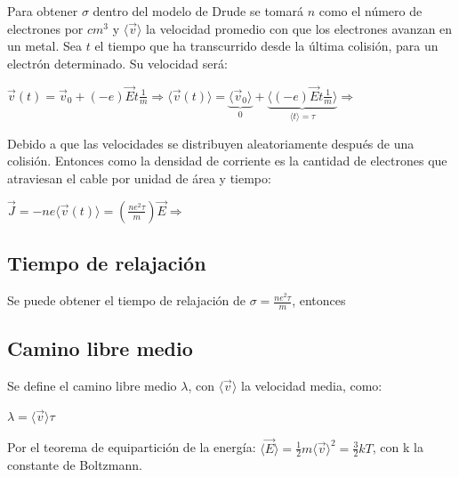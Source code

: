 \documentclass[oneside]{book}
\numberwithin{equation}{section}
\numberwithin{figure}{section}
\numberwithin{table}{section}
\begin{document}
				Para obtener $\sigma$ dentro del modelo de Drude se tomará $n$ como el número de electrones por $cm^3$ y $\langle \vec{v} \rangle$ la velocidad promedio con que los electrones avanzan en un metal. Sea $t$ el tiempo que ha transcurrido desde la última colisión, para un electrón
determinado. Su velocidad será:

				\begin{center}
					$\displaystyle \vec{v}(t)=\vec{v}_0+(-e)\vec{E}t\frac{1}{m} \Rightarrow \langle \vec{v}(t) \rangle=\underbrace{\langle \vec{v}_0 \rangle}_{0}+\underbrace{\langle(-e)\vec{E}t\frac{1}{m} \rangle}_{\langle t \rangle=\tau} \Rightarrow$ \\
				\end{center}

				Debido a que las velocidades se distribuyen aleatoriamente después de una colisión. Entonces como la densidad de corriente es la cantidad de electrones que atraviesan el cable por unidad de área y tiempo:\\
				
				\begin{center}
					$\displaystyle \vec{J}=-n e \langle \vec{v}(t) \rangle=\left( \frac{n e^2 \tau}{m}\right) \vec{E}  \Rightarrow$ 
				\end{center}
				
			\subsection{Tiempo de relajación}
			
				Se puede obtener el tiempo de relajación de $\displaystyle \sigma=\frac{n e^2 \tau}{m}$, entonces 
						
			\subsection{Camino libre medio}
			
				Se define el camino libre medio $\lambda$, con $\langle \vec{v} \rangle$ la velocidad media, como:
				
				\begin{center}
					$\lambda=\langle \vec{v} \rangle \tau$
				\end{center}		
			
				Por el teorema de equipartición de la energía: $\langle \vec{E} \rangle=\frac{1}{2}m\langle \vec{v} \rangle^2=\frac{3}{2}k T$, con k la constante de Boltzmann.
				
\end{document}
